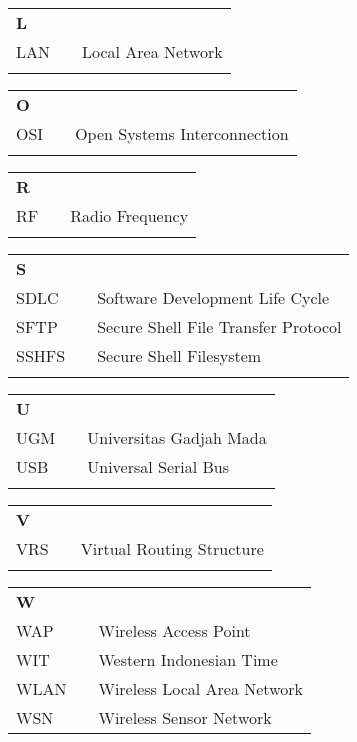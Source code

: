 \begin{tabular}{p{20pt}p{3pt}l}
	\textbf{L}\\
	LAN & & Local Area Network\\
	\\
\end{tabular}

\begin{tabular}{p{20pt}p{3pt}l}
	\textbf{O}\\
	OSI & & Open Systems Interconnection\\
	\\
\end{tabular}

\begin{tabular}{p{20pt}p{3pt}l}
	\textbf{R}\\
	RF & & Radio Frequency\\
	\\
\end{tabular}

\begin{tabular}{p{20pt}p{3pt}l}
	\textbf{S}\\
	SDLC & & Software Development Life Cycle\\
	SFTP & & Secure Shell File Transfer Protocol\\
	SSHFS & & Secure Shell Filesystem\\
	\\
\end{tabular}

\begin{tabular}{p{20pt}p{3pt}l}
	\textbf{U}\\
	UGM & & Universitas Gadjah Mada\\
	USB & & Universal Serial Bus\\
	\\
\end{tabular}

\begin{tabular}{p{20pt}p{3pt}l}
	\textbf{V}\\
	VRS & & Virtual Routing Structure\\
	\\
\end{tabular}

\begin{tabular}{p{20pt}p{3pt}l}
	\textbf{W}\\
	WAP & & Wireless Access Point\\
	WIT & & Western Indonesian Time\\
	WLAN & & Wireless Local Area Network\\
	WSN & & Wireless Sensor Network\\
\end{tabular}

